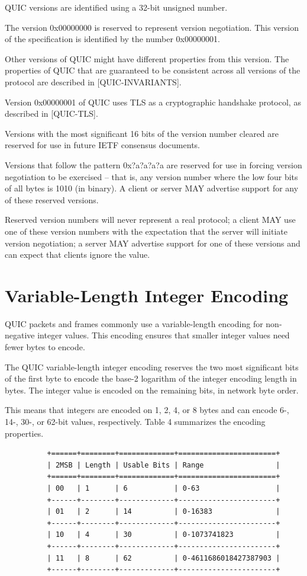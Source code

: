 \documentclass{article}
\begin{document}
QUIC versions are identified using a 32-bit unsigned number.

The version 0x00000000 is reserved to represent version negotiation. This version of the specification is identified by the number 0x00000001.

Other versions of QUIC might have different properties from this version.  The properties of QUIC that are guaranteed to be consistent across all versions of the protocol are described in [QUIC-INVARIANTS].

Version 0x00000001 of QUIC uses TLS as a cryptographic handshake protocol, as described in [QUIC-TLS].

Versions with the most significant 16 bits of the version number cleared are reserved for use in future IETF consensus documents.

Versions that follow the pattern 0x?a?a?a?a are reserved for use in forcing version negotiation to be exercised -- that is, any version number where the low four bits of all bytes is 1010 (in binary).  A client or server MAY advertise support for any of these reserved versions.

Reserved version numbers will never represent a real protocol; a client MAY use one of these version numbers with the expectation that the server will initiate version negotiation; a server MAY advertise support for one of these versions and can expect that clients ignore the value.

\section{Variable-Length Integer Encoding}

QUIC packets and frames commonly use a variable-length encoding for non-negative integer values.  This encoding ensures that smaller integer values need fewer bytes to encode.

The QUIC variable-length integer encoding reserves the two most significant bits of the first byte to encode the base-2 logarithm of the integer encoding length in bytes.  The integer value is encoded on the remaining bits, in network byte order.

This means that integers are encoded on 1, 2, 4, or 8 bytes and can encode 6-, 14-, 30-, or 62-bit values, respectively.  Table 4 summarizes the encoding properties.

\begin{verbatim}
          +======+========+=============+=======================+
          | 2MSB | Length | Usable Bits | Range                 |
          +======+========+=============+=======================+
          | 00   | 1      | 6           | 0-63                  |
          +------+--------+-------------+-----------------------+
          | 01   | 2      | 14          | 0-16383               |
          +------+--------+-------------+-----------------------+
          | 10   | 4      | 30          | 0-1073741823          |
          +------+--------+-------------+-----------------------+
          | 11   | 8      | 62          | 0-4611686018427387903 |
          +------+--------+-------------+-----------------------+
\end{verbatim}
\end{document}
